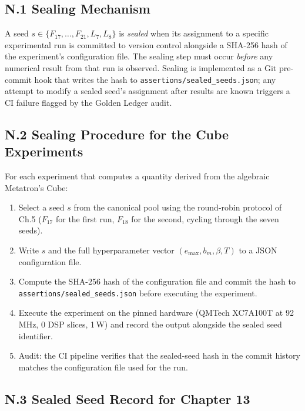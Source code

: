 \subsection*{N.1 Sealing Mechanism}
\label{fa_13:sec:13-sealing}

A seed \(s \in \{F_{17},\ldots,F_{21},L_7,L_8\}\) is \emph{sealed}
when its assignment to a specific experimental run is committed to
version control alongside a SHA-256 hash of the experiment's
configuration file.  The sealing step must occur \emph{before} any
numerical result from that run is observed.  Sealing is implemented
as a Git pre-commit hook that writes the hash to
\verb|assertions/sealed_seeds.json|; any attempt to modify a sealed
seed's assignment after results are known triggers a CI failure
flagged by the Golden Ledger audit.

\subsection*{N.2 Sealing Procedure for the Cube Experiments}
\label{fa_13:sec:13-sealing-procedure}

For each experiment that computes a quantity derived from the
algebraic Metatron's Cube:

\begin{enumerate}
\item Select a seed \(s\) from the canonical pool using the
  round-robin protocol of Ch.5 (\(F_{17}\) for the first run,
  \(F_{18}\) for the second, cycling through the seven seeds).
\item Write \(s\) and the full hyperparameter vector
  \((e_{\max}, b_m, \beta, T)\) to a JSON configuration file.
\item Compute the SHA-256 hash of the configuration file and commit
  the hash to \verb|assertions/sealed_seeds.json| before executing
  the experiment.
\item Execute the experiment on the pinned hardware (QMTech XC7A100T
  at 92\,MHz, 0 DSP slices, 1\,W) and record the output alongside
  the sealed seed identifier.
\item Audit: the CI pipeline verifies that the sealed-seed hash in
  the commit history matches the configuration file used for the run.
\end{enumerate}

\subsection*{N.3 Sealed Seed Record for Chapter 13}
\label{fa_13:sec:13-seed-record}

